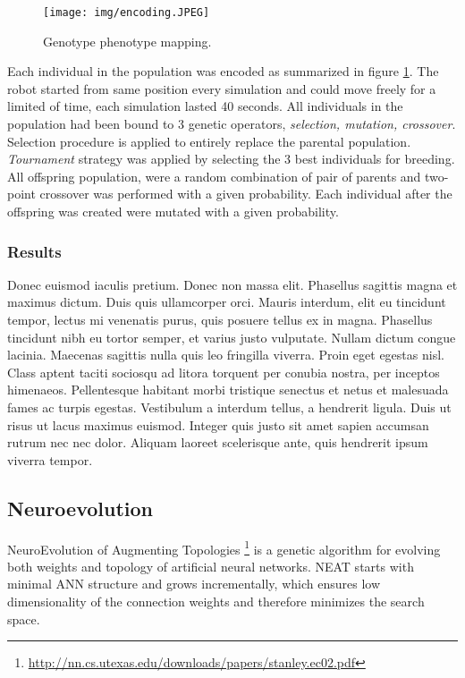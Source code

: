 \documentclass[format=acmsmall, review=false, screen=true]{acmart}
\begin{document}
\begin{figure}[H]
  \texttt{[image: img/encoding.JPEG]}
  \caption{Genotype phenotype mapping.}
  \label{fig:encoding}
\end{figure}

Each individual in the population was encoded as summarized in figure \ref{fig:encoding}. The robot started from same position every simulation and could move freely for a limited of time, each simulation lasted 40 seconds. All individuals in the population had been bound to 3 genetic operators, \emph{selection, mutation, crossover}. Selection procedure is applied to entirely replace the parental population. \emph{Tournament} strategy was applied by selecting the 3 best individuals for breeding. All offspring population, were a random combination of pair of parents and two-point crossover was performed with a given probability. Each individual after the offspring was created were mutated with a given probability.

\subsubsection{Results}

Donec euismod iaculis pretium. Donec non massa elit. Phasellus sagittis magna et maximus dictum. Duis quis ullamcorper orci. Mauris interdum, elit eu tincidunt tempor, lectus mi venenatis purus, quis posuere tellus ex in magna. Phasellus tincidunt nibh eu tortor semper, et varius justo vulputate. Nullam dictum congue lacinia. Maecenas sagittis nulla quis leo fringilla viverra. Proin eget egestas nisl. Class aptent taciti sociosqu ad litora torquent per conubia nostra, per inceptos himenaeos. Pellentesque habitant morbi tristique senectus et netus et malesuada fames ac turpis egestas. Vestibulum a interdum tellus, a hendrerit ligula. Duis ut risus ut lacus maximus euismod. Integer quis justo sit amet sapien accumsan rutrum nec nec dolor. Aliquam laoreet scelerisque ante, quis hendrerit ipsum viverra tempor.

\subsection{Neuroevolution}

NeuroEvolution of Augmenting Topologies \footnote{\url{http://nn.cs.utexas.edu/downloads/papers/stanley.ec02.pdf}} is a genetic algorithm for evolving both weights and topology of artificial neural networks. NEAT starts with minimal ANN structure and grows incrementally, which ensures low dimensionality of the connection weights and therefore minimizes the search space.
\end{document}
